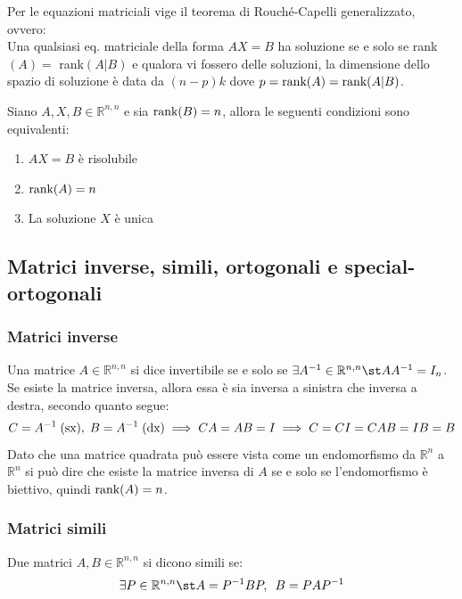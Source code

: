     \vspace{10pt}
    Per le equazioni matriciali vige il teorema di Rouché-Capelli generalizzato, ovvero: \\
    Una qualsiasi eq. matriciale della forma $AX = B$ ha soluzione se e solo se rank$(A) = $ rank$(A | B)$ e qualora vi fossero delle soluzioni, la dimensione dello
    spazio di soluzione è data da $(n - p)k$ dove $p = \textnormal{rank}(A) = \textnormal{rank}(A | B)$.

    \vspace{10pt}
    \begin{corollary}
        Siano $A, X, B \in \mathbb{R}^{n, n}$ e sia $\textnormal{rank}(B) = n$, allora le seguenti condizioni sono equivalenti:
        \begin{enumerate}[label=(\Roman*)]
            \item $AX = B$ è risolubile
            \item $\textnormal{rank}(A) = n$
            \item La soluzione $X$ è unica
        \end{enumerate}
    \end{corollary}


\vspace{10pt}
\subsection{Matrici inverse, simili, ortogonali e special-ortogonali} \label{subsec:matspecial}
    \subsubsection{Matrici inverse} \label{subsubsec:matinv}
    Una matrice $A \in \mathbb{R}^{n, n}$ si dice invertibile se e solo se $\exists A^{-1} \in \mathbb{R}^{n, n} \st AA^{-1} = I_n$. Se esiste la matrice inversa, allora essa è sia inversa a sinistra che inversa a destra, secondo quanto segue:
    \[
        C = A^{-1} \; (\textnormal{sx}), \; B = A^{-1} \; (\textnormal{dx}) \implies CA = AB = I \implies C = CI = CAB = IB = B
    \]
    Dato che una matrice quadrata può essere vista come un endomorfismo da $\mathbb{R}^{n}$ a $\mathbb{R}^{n}$ si può dire che esiste la matrice inversa di $A$ se e solo se l'endomorfismo è biettivo, quindi $\textnormal{rank}(A) = n$.

    \subsubsection{Matrici simili} \label{subsubsec:matalike}
    \vspace{10pt}
    Due matrici $A, B \in \mathbb{R}^{n, n}$ si dicono simili se:
    \[
        \exists P \in \mathbb{R}^{n, n} \st A = P^{-1}BP, \;\: B = PAP^{-1}
    \]

